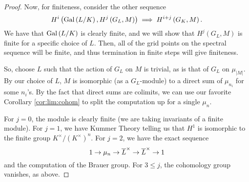 \begin{proof}
			Now, for finiteness, consider the other sequence
			\[
				H^{i}\left( \operatorname{Gal}\left( L / K \right),
				H^{j}\left( G_{L},M \right)\right)
				\implies H^{i+j}\left( G_{K},M \right)
			.\] 
			We have that \(\operatorname{Gal}\left( L / K \right)\) is clearly finite,
			and we will show that \(H^{j}\left( G_{L},M \right)\) is
			finite for a specific choice of \(L\).
			Then, all of the grid points on the spectral sequence will
			be finite, and thus termination in finite steps will give 
			finiteness.

			So, choose \(L\) such that the action of \(G_{L}\) on \(M\) 
			is trivial, as is that of \(G_{L}\) on \(\mu_{\left| M \right|}\).
			By our choice of \(L\), \(M\) is isomorphic (as a
			\(G_{L}\)-module) to a direct sum of \(\mu_{n_{i}}\) for 
			some \(n_{i}\)'s.
			By the fact that direct sums are colimits, we can use
			our favorite Corollary \ref{cor:lim:cohom} to split
			the computation up for a single \(\mu_{n}\).

			For \(j=0\), the module is clearly finite (we are taking
			invariants of a finite module).
			For \(j=1\), we have Kummer Theory
			telling us that \(H^{1}\) is isomorphic
			to the finite group \(K^{\times} / (K^{\times})^{n}\).
			For \(j = 2\), we have the exact sequence
			\[
			1 \to \mu_{n} \to \overline{L}^{\times} \to 
			\overline{L}^{\times} \to 1
			\] 
			and the computation of the Brauer group.
			For \(3 \leq j\), the cohomology group vanishes, 
			as above.

\end{proof}


